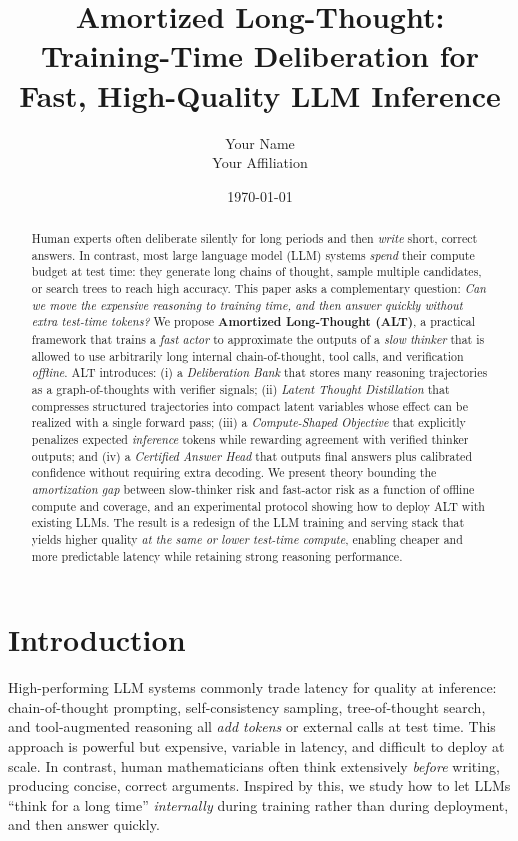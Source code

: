 \documentclass[11pt]{article}
\title{Amortized Long-Thought: Training-Time Deliberation for Fast, High-Quality LLM Inference}
\author{Your Name \\ Your Affiliation}
\date{\today}
\newcommand{\1}{\mathbf{1}}
\begin{document}
\maketitle

\begin{abstract}
Human experts often deliberate silently for long periods and then \emph{write} short, correct answers. In contrast, most large language model (LLM) systems \emph{spend} their compute budget at test time: they generate long chains of thought, sample multiple candidates, or search trees to reach high accuracy. This paper asks a complementary question: \emph{Can we move the expensive reasoning to training time, and then answer quickly without extra test-time tokens?} We propose \textbf{Amortized Long-Thought (ALT)}, a practical framework that trains a \emph{fast actor} to approximate the outputs of a \emph{slow thinker} that is allowed to use arbitrarily long internal chain-of-thought, tool calls, and verification \emph{offline}. ALT introduces: (i) a \emph{Deliberation Bank} that stores many reasoning trajectories as a graph-of-thoughts with verifier signals; (ii) \emph{Latent Thought Distillation} that compresses structured trajectories into compact latent variables whose effect can be realized with a single forward pass; (iii) a \emph{Compute-Shaped Objective} that explicitly penalizes expected \emph{inference} tokens while rewarding agreement with verified thinker outputs; and (iv) a \emph{Certified Answer Head} that outputs final answers plus calibrated confidence without requiring extra decoding. We present theory bounding the \emph{amortization gap} between slow-thinker risk and fast-actor risk as a function of offline compute and coverage, and an experimental protocol showing how to deploy ALT with existing LLMs. The result is a redesign of the LLM training and serving stack that yields higher quality \emph{at the same or lower test-time compute}, enabling cheaper and more predictable latency while retaining strong reasoning performance.
\end{abstract}

\section{Introduction}

High-performing LLM systems commonly trade latency for quality at inference: chain-of-thought prompting, self-consistency sampling, tree-of-thought search, and tool-augmented reasoning all \emph{add tokens} or external calls at test time. This approach is powerful but expensive, variable in latency, and difficult to deploy at scale. In contrast, human mathematicians often think extensively \emph{before} writing, producing concise, correct arguments. Inspired by this, we study how to let LLMs ``think for a long time'' \emph{internally} during training rather than during deployment, and then answer quickly.
\end{document}
